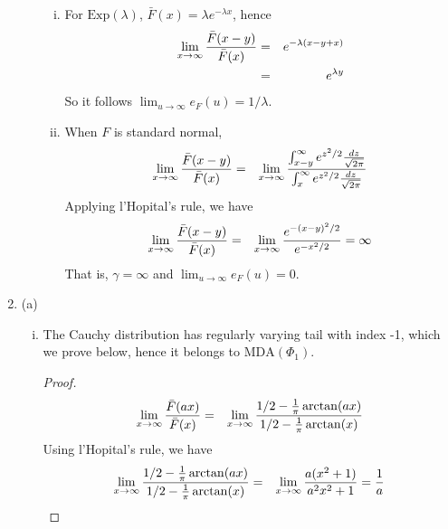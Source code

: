 \documentclass{report}
\begin{document}
\begin{enumerate}[1.]
\begin{enumerate}[(a)]
\begin{enumerate}[(i)]
    \item For $\text{Exp}(\lambda)$, $\bar{F}(x) = \lambda e^{-\lambda
        x}$, hence
      \begin{eqnarray*}
        \lim_{x \to \infty} {\bar{F}(x - y) \over \bar{F}(x)} &=&
        e^{-\lambda (x - y + x)} \\
        &=& e^{\lambda y}
      \end{eqnarray*}
      So it follows $\lim_{u \to \infty} e_F(u) = 1/\lambda$.

    \item When $F$ is standard normal,
      \begin{eqnarray*}
        \lim_{x \to \infty} {\bar{F}(x - y) \over \bar{F}(x)} &=&
        \lim_{x \to \infty} \frac{
          \int_{x-y}^{\infty} e^{z^2/2} {dz \over \sqrt{2\pi}}
        }{
          \int_{x}^{\infty} e^{z^2/2} {dz \over \sqrt{2\pi}}
        }
      \end{eqnarray*}
      Applying l'Hopital's rule, we have
      \begin{eqnarray*}
        \lim_{x \to \infty} {\bar{F}(x - y) \over \bar{F}(x)} &=&
        \lim_{x \to \infty} {e^{-(x-y)^2/2} \over e^{-x^2/2}} = \infty\\
      \end{eqnarray*}
      That is, $\gamma = \infty$ and $\lim_{u \to \infty} e_F(u) =
      0$.
    \end{enumerate}
  \end{enumerate}
\item
  \begin{enumerate}{(a)}
    \begin{enumerate}[(i)]
    \item The Cauchy distribution has regularly varying tail with index
      -1, which we prove below, hence it belongs to
      $\text{MDA}(\Phi_{1})$.

      \begin{proof}
        \begin{eqnarray*}
          \lim_{x \to \infty} {\bar{F}(ax) \over \bar{F}(x)} &=&
          \lim_{x \to \infty}
          {
            1/2 - {1 \over \pi} \arctan(ax)
            \over
            1/2 - {1 \over \pi} \arctan(x)
          }
        \end{eqnarray*}
        Using l'Hopital's rule, we have
        \begin{eqnarray*}
          \lim_{x \to \infty}
          {
            1/2 - {1 \over \pi} \arctan(ax)
            \over
            1/2 - {1 \over \pi} \arctan(x)
          } &=&
          \lim_{x \to \infty} {
            a(x^2 + 1)
            \over
            a^2 x^2 + 1
          } = {1 \over a}
        \end{eqnarray*}
      \end{proof}


\end{enumerate}
\end{enumerate}
\end{enumerate}
\end{document}
